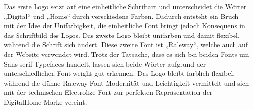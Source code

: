 Das erste Logo setzt auf eine einheitliche Schriftart und unterscheidet die Wörter „Digital“ und „Home“ durch verschiedene Farben. Dadurch entsteht ein Bruch mit der Idee der Unifarbigkeit, die einheitliche Font bringt jedoch Konsequenz in das Schriftbild des Logos.
Das zweite Logo bleibt unifarben und damit flexibel, während die Schrift sich ändert. Diese zweite Font ist „Raleway“, welche auch auf der Website verwendet wird. Trotz der Tatsache, dass es sich bei beiden Fonts um Sans-serif Typefaces handelt, lassen sich beide Wörter aufgrund der unterschiedlichen Font-weight gut erkennen. Das Logo bleibt farblich flexibel, während die dünne Raleway Font Modernität und Leichtigkeit vermittelt und sich mit der technischen Electrolize Font zur perfekten Repräsentation der DigitalHome Marke vereint.
